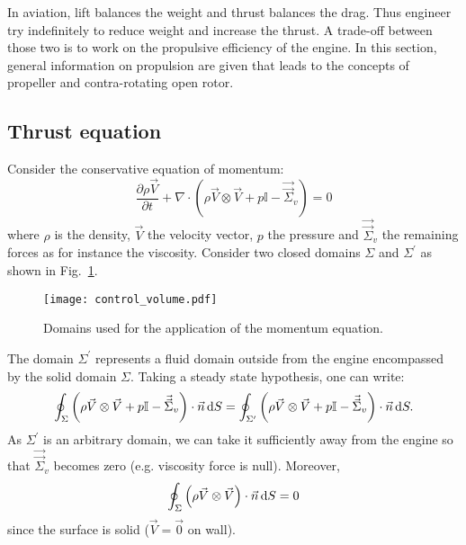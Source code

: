 
In aviation, lift balances the weight and 
thrust balances the drag. Thus engineer try
indefinitely to reduce weight and increase the
thrust. A trade-off between those two is to work
on the propulsive efficiency of the engine. In this
section, general information on propulsion are given
that leads to the concepts of propeller and
contra-rotating open rotor.

\subsection{Thrust equation}
\label{sub:cror_thrust}
Consider the conservative equation of momentum:
\begin{equation}
	\frac{\partial \rho \vec{V}}{\partial t} 
	+ \nabla \cdot (\rho \vec{V} \otimes \vec{V} + p \mathbb{I} - \vec{\vec{\Sigma}}_v) = 0
\end{equation}
where $\rho$ is the density, $\vec{V}$ the velocity vector, $p$ the pressure and
$\vec{\vec{\Sigma}}_v$ the remaining forces as for instance the viscosity.
Consider two closed domains $\Sigma$ and $\Sigma^\prime$ as
shown in Fig.~\ref{fig:cror_control_volume}.
\begin{figure}[htb]
  \centering
  \texttt{[image: control\_volume.pdf]}
  \caption{Domains used for the application of the momentum equation.}
  \label{fig:cror_control_volume}
\end{figure}
The domain $\Sigma^\prime$ represents a fluid domain outside from the
engine encompassed by the solid domain $\Sigma$.
Taking a steady state hypothesis, one can write:
\begin{equation}
	\oint_{\Sigma} \left(\rho \vec{V} \otimes \vec{V} + 
	                       p \mathbb{I} - 
	                       \vec{\vec{\Sigma}}_v \right) \cdot \vec{n} \mathop{}\!\mathrm{d} S
    =
   	\oint_{\Sigma^\prime} \left(\rho \vec{V} \otimes \vec{V} + 
	                       p \mathbb{I} - 
	                       \vec{\vec{\Sigma}}_v \right) \cdot \vec{n} \mathop{}\!\mathrm{d} S.
\end{equation} 
As $\Sigma^\prime$ is an arbitrary domain, we can take it sufficiently
away from the engine so that $\vec{\vec{\Sigma}}_v$ becomes zero (e.g.
viscosity force is null).
Moreover, 
\begin{equation}
	\oint_{\Sigma} \left(\rho \vec{V} \otimes \vec{V} \right) \cdot \vec{n} \mathop{}\!\mathrm{d} S = 0
\end{equation}
since the surface is solid ($\vec{V} = \vec{0}$ on wall). 
